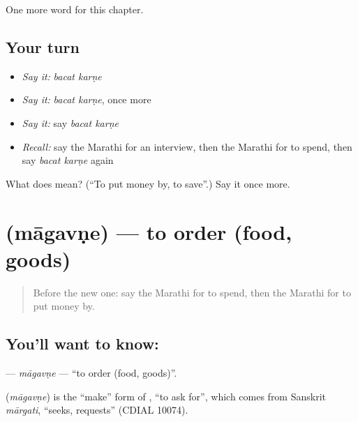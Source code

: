 \begin{grammarlens}[title={What you've built}]
One more word for this chapter.
\end{grammarlens}

\subsection*{Your turn}
\begin{itemize}
\raggedright
  \item \emph{Say it:} \emph{bacat karṇe}
  \item \emph{Say it:} \emph{bacat karṇe}, once more
  \item \emph{Say it:} say \emph{bacat karṇe}
  \item \emph{Recall:} say the Marathi for an interview, then the Marathi for to spend, then say \emph{bacat karṇe} again
\end{itemize}

\begin{tcolorbox}[breakable,colback=teal!4,colframe=teal!35!black,title={Before you move on}]
What does   mean? (\textquotedblleft{}To put money by, to save\textquotedblright{}.) Say it once more.
\end{tcolorbox}
\section[\texorpdfstring{\mr{मागवणे} (māgavṇe)}{मागवणे (māgavṇe)}]{ (māgavṇe) — to order (food, goods)}

\label{lesson:MR-C193-magavne}



\begin{quote}
Before the new one: say the Marathi for to spend, then the Marathi for to put money by.
\end{quote}

\subsection*{You'll want to know: }
\textbf{} — \emph{māgavṇe} — \textquotedblleft{}to order (food, goods)\textquotedblright{}.

\begin{cousinweb}
\textbf{} (\emph{māgavṇe}) is the \textquotedblleft{}make\textquotedblright{} form of \textbf{}, \textquotedblleft{}to ask for\textquotedblright{}, which comes from Sanskrit \emph{mārgati}, \textquotedblleft{}seeks, requests\textquotedblright{} (CDIAL 10074).
\end{cousinweb}

